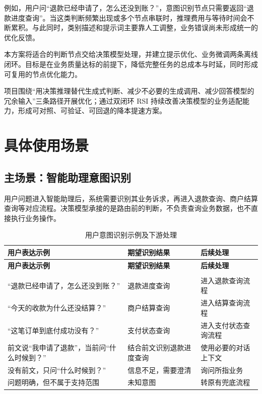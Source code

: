 \documentclass[UTF8,a4paper,11pt,fontset=windows]{ctexart}
\begin{document}
例如，用户问“退款已经申请了，怎么还没到账？”，意图识别节点只需要返回“退款进度查询”。当这类判断频繁出现或多个节点串联时，推理费用与等待时间会不断累积。与此同时，类别描述和提示词主要靠人工调整，业务错误尚未形成统一的优化反馈。


本方案将适合的判断节点交给决策模型处理，并建立提示优化、业务微调两条离线闭环。目标是在业务质量达标的前提下，降低完整任务的总成本与时延，同时形成可复用的节点优化能力。


项目围绕“用决策推理替代生成式判断、减少不必要的生成调用、减少回答模型的冗余输入”三条路径开展优化；通过双闭环 RSI 持续改善决策模型的业务适配能力，形成可对照、可验证、可回退的降本提速方案。


\section{具体使用场景}

\subsection{主场景：智能助理意图识别}

用户问题进入智能助理后，系统需要识别其业务诉求，再进入退款查询、商户结算查询等对应流程。决策模型承接的是路由前的判断，不负责查询业务数据，也不直接执行业务操作。


{\small\setlength{\tabcolsep}{4pt}\renewcommand{\arraystretch}{1.28}
\begin{longtable}{>{\raggedright\arraybackslash}p{0.220\dimexpr\linewidth-6\tabcolsep\relax}>{\raggedright\arraybackslash}p{0.380\dimexpr\linewidth-6\tabcolsep\relax}>{\raggedright\arraybackslash}p{0.400\dimexpr\linewidth-6\tabcolsep\relax}}
\caption{用户意图识别示例及下游处理}\label{tab:intent-examples}\\
\toprule
\textbf{用户表达示例} & \textbf{期望识别结果} & \textbf{后续处理} \\
\midrule
\endfirsthead
\toprule
\textbf{用户表达示例} & \textbf{期望识别结果} & \textbf{后续处理} \\
\midrule
\endhead
\midrule\multicolumn{3}{r}{\scriptsize\color{Muted}续下页}\\\endfoot
\bottomrule\endlastfoot
“退款已经申请了，怎么还没到账？” & 退款进度查询 & 进入退款查询流程 \\
“今天的收款为什么还没结算？” & 商户结算查询 & 进入结算查询流程 \\
“这笔订单到底付成功没有？” & 支付状态查询 & 进入支付状态查询流程 \\
前文说“我申请了退款”，当前问“什么时候到？” & 结合前文识别退款进度查询 & 使用必要的对话上下文 \\
没有前文，只问“什么时候到？” & 信息不足，需要澄清 & 询问所指业务 \\
问题明确，但不属于支持范围 & 未知意图 & 转原有兜底流程 \\
\end{longtable}}
\end{document}

